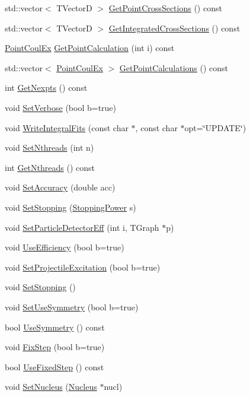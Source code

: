 \begin{DoxyCompactItemize}
\item 
std\-::vector$<$ T\-Vector\-D $>$ \hyperlink{classExperiments_a536e796fba4df63d62c9f3277f910a73}{Get\-Point\-Cross\-Sections} () const 
\item 
std\-::vector$<$ T\-Vector\-D $>$ \hyperlink{classExperiments_a47a82e8b042491288d6b900ad9198c35}{Get\-Integrated\-Cross\-Sections} () const 
\item 
\hyperlink{classPointCoulEx}{Point\-Coul\-Ex} \hyperlink{classExperiments_ad4c9c3bcb227b9982d52654e28dab360}{Get\-Point\-Calculation} (int i) const 
\item 
std\-::vector$<$ \hyperlink{classPointCoulEx}{Point\-Coul\-Ex} $>$ \hyperlink{classExperiments_aed971cdffd3863f01d1246b3810ad190}{Get\-Point\-Calculations} () const 
\item 
int \hyperlink{classExperiments_a6e6df0546be0608c2ff936f7bbf3a0bb}{Get\-Nexpts} () const 
\item 
void \hyperlink{classExperiments_a5bc069b7d1388ed1aac87600bff18b43}{Set\-Verbose} (bool b=true)
\item 
void \hyperlink{classExperiments_add6a2b8636244411a03515f396b3603d}{Write\-Integral\-Fits} (const char $\ast$, const char $\ast$opt=\char`\"{}U\-P\-D\-A\-T\-E\char`\"{})
\item 
void \hyperlink{classExperiments_ac8f99d06ff63f2e0fda80ad647edd3b6}{Set\-Nthreads} (int n)
\item 
int \hyperlink{classExperiments_a0b5789577937188a891a2c5e70b3c8e6}{Get\-Nthreads} () const 
\item 
void \hyperlink{classExperiments_a8aa4eb6fa6131902a90a4c602bb055f7}{Set\-Accuracy} (double acc)
\item 
void \hyperlink{classExperiments_a777e9756290797247971042c4e64ed9e}{Set\-Stopping} (\hyperlink{classStoppingPower}{Stopping\-Power} s)
\item 
void \hyperlink{classExperiments_ac3ecd5d912831599b4b4a2ae290a012e}{Set\-Particle\-Detector\-Eff} (int i, T\-Graph $\ast$p)
\item 
void \hyperlink{classExperiments_a7902dd87eee8cf24ded441ba889f97fb}{Use\-Efficiency} (bool b=true)
\item 
void \hyperlink{classExperiments_a2766ab644312a272bde08e4abfa02c18}{Set\-Projectile\-Excitation} (bool b=true)
\item 
void \hyperlink{classExperiments_a9be7f0d32798b9d3bd747b64bfde10bf}{Set\-Stopping} ()
\item 
void \hyperlink{classExperiments_accb72436627285ddd8af0942880a2923}{Set\-Use\-Symmetry} (bool b=true)
\item 
bool \hyperlink{classExperiments_a663cb76eb3eca8b3f7dcea60e6095160}{Use\-Symmetry} () const 
\item 
void \hyperlink{classExperiments_afd01d2d6c4234e033e7bf9b51685e80c}{Fix\-Step} (bool b=true)
\item 
bool \hyperlink{classExperiments_aea5750858fe154f1e56bc0da6cd755f3}{Use\-Fixed\-Step} () const 
\item 
void \hyperlink{classExperiments_aaf5c83e47839907971daae64ea4385df}{Set\-Nucleus} (\hyperlink{classNucleus}{Nucleus} $\ast$nucl)
\end{DoxyCompactItemize}


